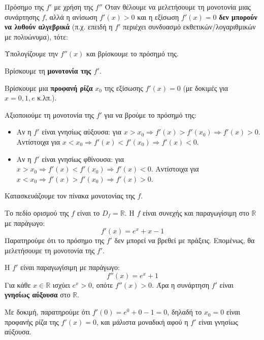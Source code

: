 \begin{askhsh}{Πρόσημο της $f'$ με χρήση της $f''$}
Όταν θέλουμε να μελετήσουμε τη μονοτονία μιας συνάρτησης $f$, αλλά η ανίσωση $f'(x)>0$ και η εξίσωση $f'(x)=0$ \textbf{δεν μπορούν να λυθούν αλγεβρικά} (π.χ. επειδή η $f'$ περιέχει συνδυασμό εκθετικών/λογαριθμικών με πολυώνυμα), τότε:

\bhmata
\begin{bhma}
\item Υπολογίζουμε την $f''(x)$ και βρίσκουμε το πρόσημό της.
\item Βρίσκουμε τη \textbf{μονοτονία της $f'$}.
\item Βρίσκουμε μια \textbf{προφανή ρίζα} $x_0$ της εξίσωσης $f'(x)=0$ (με δοκιμές για $x=0, 1, e$ κ.λπ.).
\item Αξιοποιούμε τη μονοτονία της $f'$ για να βρούμε το πρόσημό της:
\begin{itemize}
    \item Αν η $f'$ είναι γνησίως αύξουσα: για $x > x_0 \Rightarrow f'(x) > f'(x_0) \Rightarrow f'(x) > 0$. Αντίστοιχα για $x < x_0 \Rightarrow f'(x) < f'(x_0) \Rightarrow f'(x) < 0$.
    \item Αν η $f'$ είναι γνησίως φθίνουσα: για $x > x_0 \Rightarrow f'(x) < f'(x_0) \Rightarrow f'(x) < 0$. Αντίστοιχα για $x < x_0 \Rightarrow f'(x) > f'(x_0) \Rightarrow f'(x) > 0$.
\end{itemize}
\item Κατασκευάζουμε τον πίνακα μονοτονίας της $f$.
\end{bhma}
\end{askhsh}


\lysh
Το πεδίο ορισμού της $f$ είναι το $D_f = \mathbb{R}$. Η $f$ είναι συνεχής και παραγωγίσιμη στο $\mathbb{R}$ με παράγωγο:
\[ f'(x) = e^x + x - 1 \]
Παρατηρούμε ότι το πρόσημο της $f'$ δεν μπορεί να βρεθεί με πράξεις. Επομένως, θα μελετήσουμε τη μονοτονία της $f'$.

Η $f'$ είναι παραγωγίσιμη με παράγωγο:
\[ f''(x) = e^x + 1 \]
Για κάθε $x \in \mathbb{R}$ ισχύει $e^x > 0$, οπότε $f''(x) > 0$. 
Άρα η συνάρτηση $f'$ είναι \textbf{γνησίως αύξουσα} στο $\mathbb{R}$.

Με δοκιμή, παρατηρούμε ότι $f'(0) = e^0 + 0 - 1 = 0$, δηλαδή το $x_0 = 0$ είναι προφανής ρίζα της $f'(x)=0$, και μάλιστα μοναδική αφού η $f'$ είναι γνησίως αύξουσα. 


